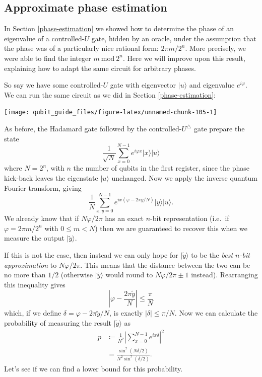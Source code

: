 \documentclass[fleqn,a4paper]{article}
\theoremstyle{definition}
\theoremstyle{definition}
\theoremstyle{definition}
\theoremstyle{definition}
\theoremstyle{remark}
\begin{document}
\hypertarget{approximate-phase-estimation}{%
\subsection{Approximate phase estimation}\label{approximate-phase-estimation}}

In Section \ref{phase-estimation} we showed how to determine the phase of an eigenvalue of a controlled-\(U\) gate, hidden by an oracle, under the assumption that the phase was of a particularly nice rational form: \(2\pi m/2^n\).
More precisely, we were able to find the integer \(m\ \mathrm{mod}\ 2^n\).
Here we will improve upon this result, explaining how to adapt the same circuit for arbitrary phases.

So say we have some controlled-\(U\) gate with eigenvector \(|u\rangle\) and eigenvalue \(e^{i\varphi}\).
We can run the same circuit as we did in Section \ref{phase-estimation}:

\begin{center}\texttt{[image: qubit\_guide\_files/figure-latex/unnamed-chunk-105-1]} \end{center}

As before, the Hadamard gate followed by the controlled-\(U^\triangle\) gate prepare the state
\[
  \frac{1}{\sqrt{N}} \sum_{x=0}^{N-1} e^{i\varphi x}|x\rangle|u\rangle
\]
where \(N=2^n\), with \(n\) the number of qubits in the first register, since the phase kick-back leaves the eigenstate \(|u\rangle\) unchanged.
Now we apply the inverse quantum Fourier transform, giving
\[
  \frac{1}{N} \sum_{x,y=0}^{N-1} e^{ix(\varphi-2\pi y/N)}|y\rangle|u\rangle.
\]
We already know that if \(N\varphi/2\pi\) has an exact \(n\)-bit representation (i.e.~if \(\varphi=2\pi m/2^n\) with \(0\leqslant m<N\)) then we are guaranteed to recover this when we measure the output \(|\widetilde{y}\rangle\).

If this is not the case, then instead we can only hope for \(|\widetilde{y}\rangle\) to be the \emph{best \(n\)-bit approximation} to \(N\varphi/2\pi\).
This means that the distance between the two can be no more than \(1/2\) (otherwise \(|\widetilde{y}\rangle\) would round to \(N\varphi/2\pi\pm1\) instead).
Rearranging this inequality gives
\[
  \left\vert\varphi-\frac{2\pi\widetilde{y}}{N}\right\vert
  \leqslant\frac{\pi}{N}
\]
which, if we define \(\delta=\varphi-2\pi\widetilde{y}/N\), is exactly \(|\delta|\leqslant\pi/N\).
Now we can calculate the probability of measuring the result \(|\widetilde{y}\rangle\) as
\[
  \begin{aligned}
    p
    &\coloneqq \frac{1}{N^2}\left\vert\sum_{x=0}^{N-1} e^{ix\delta}\right\vert^2
  \\&= \frac{\sin^2(N\delta/2)}{N^2\sin^2(\delta/2)}.
  \end{aligned}
\]
Let's see if we can find a lower bound for this probability.
\end{document}
